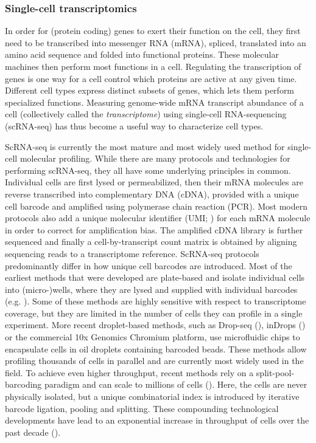 \subsubsection{Single-cell transcriptomics}

In order for (protein coding) genes to exert their function on the cell, they first need to be transcribed into messenger RNA (mRNA), spliced, translated into an amino acid sequence and folded into functional proteins. These molecular machines then perform most functions in a cell. Regulating the transcription of genes is one way for a cell control which proteins are active at any given time. Different cell types express distinct subsets of genes, which lets them perform specialized functions. Measuring genome-wide mRNA transcript abundance of a cell (collectively called the \textit{transcriptome}) using single-cell RNA-sequencing (scRNA-seq) has thus become a useful way to characterize cell types. 

ScRNA-seq is currently the most mature and most widely used method for single-cell molecular profiling. While there are many protocols and technologies for performing scRNA-seq, they all have some underlying principles in common. Individual cells are first lysed or permeabilized, then their mRNA molecules are reverse transcribed into complementary DNA (cDNA), provided with a unique cell barcode and amplified using polymerase chain reaction (PCR). Most modern protocols also add a unique molecular identifier (UMI; \cite{islam_quantitative_2014}) for each mRNA molecule in order to correct for amplification bias. The amplified cDNA library is further sequenced and finally a cell-by-transcript count matrix is obtained by aligning sequencing reads to a transcriptome reference. ScRNA-seq protocols predominantly differ in how unique cell barcodes are introduced. Most of the earliest methods that were developed are plate-based and isolate individual cells into (micro-)wells, where they are lysed and supplied with individual barcodes (e.g. \cite{picelli_smart-seq2_2013,shalek_single-cell_2014,jaitin_massively_2014,treutlein_reconstructing_2014}). Some of these methods are highly sensitive with respect to transcriptome coverage, but they are limited in the number of cells they can profile in a single experiment. More recent droplet-based methods, such as Drop-seq (\cite{macosko_highly_2015}), inDrops (\cite{klein_droplet_2015}) or the commercial 10x Genomics Chromium platform, use microfluidic chips to encapsulate cells in oil droplets containing barcoded beads. These methods allow profiling thousands of cells in parallel and are currently most widely used in the field. To achieve even higher throughput, recent methods rely on a split-pool-barcoding paradigm and can scale to millions of cells (\cite{rosenberg_single-cell_2018,yin_high-throughput_2019,cao_comprehensive_2017}). Here, the cells are never physically isolated, but a unique combinatorial index is introduced by iterative barcode ligation, pooling and splitting. These compounding technological developments have lead to an exponential increase in throughput of cells over the past decade (\cite{svensson_exponential_2018}).

